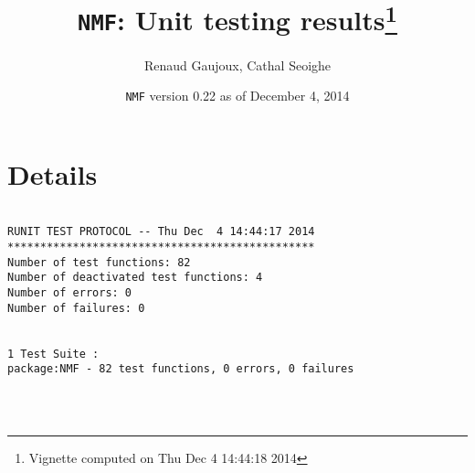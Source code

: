 \documentclass[10pt]{article}\usepackage[]{graphicx}\usepackage[]{color}
\author{Renaud Gaujoux, Cathal Seoighe}
\title{\texttt{NMF}: Unit testing results\footnote{Vignette computed  on Thu Dec  4 14:44:18 2014}}
\date{\texttt{NMF} version 0.22 as of December  4, 2014}
\begin{document}
\maketitle

\section{Details}
\begin{verbatim}

RUNIT TEST PROTOCOL -- Thu Dec  4 14:44:17 2014 
*********************************************** 
Number of test functions: 82 
Number of deactivated test functions: 4 
Number of errors: 0 
Number of failures: 0 

 
1 Test Suite : 
package:NMF - 82 test functions, 0 errors, 0 failures




\end{verbatim}
\end{document}
